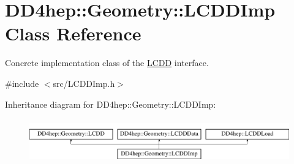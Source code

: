 \hypertarget{class_d_d4hep_1_1_geometry_1_1_l_c_d_d_imp}{}\section{D\+D4hep\+:\+:Geometry\+:\+:L\+C\+D\+D\+Imp Class Reference}
\label{class_d_d4hep_1_1_geometry_1_1_l_c_d_d_imp}


Concrete implementation class of the \hyperlink{class_d_d4hep_1_1_geometry_1_1_l_c_d_d}{L\+C\+DD} interface.  




{\ttfamily \#include $<$src/\+L\+C\+D\+D\+Imp.\+h$>$}

Inheritance diagram for D\+D4hep\+:\+:Geometry\+:\+:L\+C\+D\+D\+Imp\+:\begin{figure}[H]
\begin{center}
\leavevmode
\includegraphics[height=1.944445cm]{class_d_d4hep_1_1_geometry_1_1_l_c_d_d_imp}
\end{center}
\end{figure}
